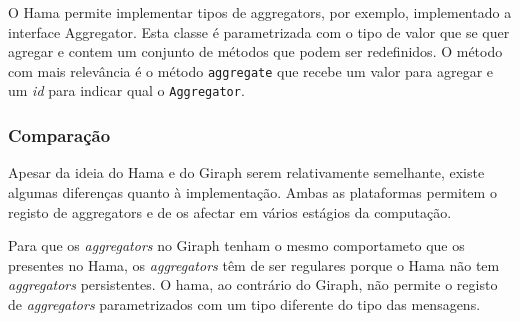     O Hama permite implementar tipos de aggregators, por exemplo, implementado 
a interface Aggregator.
    Esta classe é parametrizada com o tipo de valor que se quer agregar e contem 
um conjunto de métodos que podem ser redefinidos.
    O método com mais relevância é o método \texttt{aggregate} que recebe um 
valor para agregar e um \textit{id} para indicar qual o \texttt{Aggregator}.

  \subsubsection*{Comparação}
  
  Apesar da ideia do Hama e do Giraph serem relativamente semelhante, existe algumas diferenças quanto à implementação. Ambas as plataformas
  permitem o registo de aggregators e de os afectar em vários estágios da computação. 
  
  Para que os \textit{aggregators} no Giraph tenham o mesmo comportameto que os presentes no Hama, os \textit{aggregators} têm de ser regulares porque o Hama não tem \textit{aggregators} persistentes. O hama, ao contrário do Giraph, não permite o registo de \textit{aggregators} parametrizados com um tipo diferente do tipo das mensagens.
  
